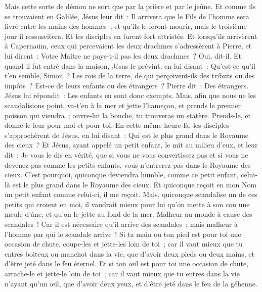 \begin{multicols}{2}
Mais cette sorte de démon ne sort que par la prière et par le jeûne.
Et comme ils se trouvaient en Galilée, Jésus leur dit~: Il arrivera que le Fils de l'homme sera livré entre les mains des hommes~;
et qu'ils le feront mourir, mais le troisième jour il ressuscitera. Et les disciples en furent fort attristés.
Et lorsqu'ils arrivèrent à Capernaüm, ceux qui percevaient les deux drachmes s'adressèrent à Pierre, et lui dirent~: Votre Maître ne paye-t-il pas les deux drachmes~?
Oui, dit-il. Et quand il fut entré dans la maison, Jésus le prévint, en lui disant~: Qu'est-ce qu'il t'en semble, Simon~? Les rois de la terre, de qui perçoivent-ils des tributs ou des impôts~? Est-ce de leurs enfants ou des étrangers~?
Pierre dit~: Des étrangers. Jésus lui répondit~: Les enfants en sont donc exempts.
Mais, afin que nous ne les scandalisions point, va-t'en à la mer et jette l'hameçon, et prends le premier poisson qui viendra~; ouvre-lui la bouche, tu trouveras un statère. Prends-le, et donne-le-leur pour moi et pour toi.
\VerseOne{}En cette même heure-là, les disciples s'approchèrent de Jésus, en lui disant~: Qui est le plus grand dans le Royaume des cieux~?
Et Jésus, ayant appelé un petit enfant, le mit au milieu d'eux,
et leur dit~: Je vous le dis en vérité, que si vous ne vous convertissez pas et si vous ne devenez pas comme les petits enfants, vous n'entrerez pas dans le Royaume des cieux.
C'est pourquoi, quiconque deviendra humble, comme ce petit enfant, celui-là est le plus grand dans le Royaume des cieux.
Et quiconque reçoit en mon Nom un petit enfant comme celui-ci, il me reçoit.
Mais, quiconque scandalise un de ces petits qui croient en moi, il vaudrait mieux pour lui qu'on mette à son cou une meule d'âne, et qu'on le jette au fond de la mer.
Malheur au monde à cause des scandales~! Car il est nécessaire qu'il arrive des scandales~; mais malheur à l'homme par qui le scandale arrive~!
Si ta main ou ton pied est pour toi une occasion de chute, coupe-les et jette-les loin de toi~; car il vaut mieux que tu entres boiteux ou manchot dans la vie, que d'avoir deux pieds ou deux mains, et d'être jeté dans le feu éternel.
Et si ton œil est pour toi une occasion de chute, arrache-le et jette-le loin de toi~; car il vaut mieux que tu entres dans la vie n'ayant qu'un œil, que d'avoir deux yeux, et d'être jeté dans le feu de la géhenne.

\end{multicols}
